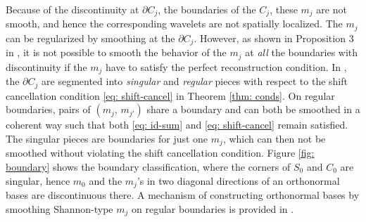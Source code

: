 Because of the discontinuity at $\partial C_j$, the boundaries of the $C_j$, these $m_j$ are not smooth, and hence the corresponding wavelets are not spatially localized. The $m_j$ can be regularized by smoothing at the $\partial C_j$.
However, as shown in Proposition 3 in \cite{durand2007}, it is not possible to smooth the behavior of the $m_j$ at  {\it all} the boundaries with discontinuity if the $m_j$ have to satisfy the perfect reconstruction condition.
In \cite{yin2014orthshear}, the $\partial C_j$ are segmented into {\it singular} and {\it regular} pieces with respect to the shift cancellation condition \eqref{eq: shift-cancel} in Theorem \ref{thm: conds}. On regular boundaries, pairs of $(m_j,\, m_{j'})$ share a boundary and can both be smoothed in a coherent way such that both \eqref{eq: id-sum} and \eqref{eq: shift-cancel} remain satisfied. The singular pieces are boundaries for just one $m_j$, which can then not be smoothed without violating the shift cancellation condition. Figure \ref{fig: boundary} shows the boundary classification, where the corners of $S_0$ and $C_0$ are singular, hence $m_0$ and the $m_j$'s in two diagonal directions of an orthonormal bases are discontinuous there. A mechanism of constructing orthonormal bases by smoothing Shannon-type $m_j$ on regular boundaries is provided in \cite{yin2014orthshear}.%



